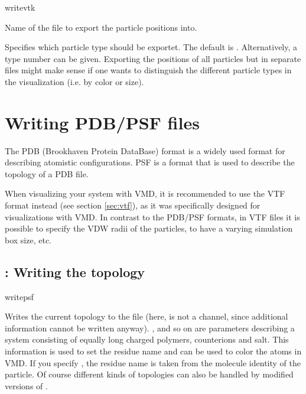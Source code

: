 \begin{essyntax}
  writevtk  
\end{essyntax}

\begin{arguments}
\item[\var{filename}]
  Name of the file to export the particle positions into.

\item[\opt{\alt{all \asep \var{type}}}] Specifies which particle type
  should be exportet. The default is . Alternatively, a
  type number can be given. Exporting the positions of all particles
  but in separate files might make sense if one wants to distinguish
  the different particle types in the visualization (i.e. by color or
  size).
\end{arguments}

\section{Writing PDB/PSF files}
The PDB (Brookhaven Protein DataBase) format is a widely used format
for describing atomistic configurations. PSF is a format that is used
to describe the topology of a PDB file. 

When visualizing your system with VMD, it is recommended to use the
VTF format instead (see section \ref{sec:vtf}), as it was specifically
designed for visualizations with VMD. In contrast to the PDB/PSF
formats, in VTF files it is possible to specify the VDW radii of the
particles, to have a varying simulation box size, etc.

\subsection{: Writing the topology}

\begin{essyntax}
  writepsf     
   
\end{essyntax}
Writes the current topology to the file  (here, 
is not a channel, since additional information cannot be written
anyway).  ,  and so on are parameters describing a
system consisting of equally long charged polymers, counterions and
salt.  This information is used to set the residue name and can be
used to color the atoms in VMD. If you specify , the
residue name is taken from the molecule identity of the particle. Of
course different kinds of topologies can also be handled by modified
versions of .


